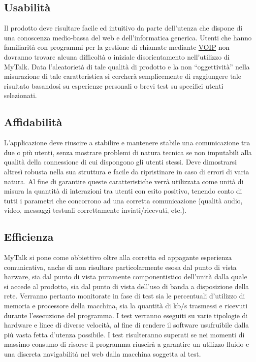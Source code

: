 \subsection{Usabilità}
Il prodotto deve risultare facile ed intuitivo da parte dell'utenza che dispone di una conoscenza medio-bassa del web e dell'informatica generica.
Utenti che hanno familiarità con programmi per la gestione di chiamate mediante \underline{VOIP} non dovranno trovare alcuna difficoltà o iniziale disorientamento nell'utilizzo di MyTalk.
Data l'aleatorietà di tale qualità di prodotto e la non ``oggettività'' nella misurazione di tale caratteristica si cercherà semplicemente di raggiungere tale risultato basandosi su esperienze personali o brevi test su specifici utenti selezionati.
\subsection{Affidabilità}
L'applicazione deve riuscire a stabilire e mantenere stabile una comunicazione tra due o più utenti, senza mostrare problemi di natura tecnica se non imputabili alla qualità della connessione di cui dispongono gli utenti stessi. Deve dimostrarsi altresì robusta nella sua struttura e facile da ripristinare in caso di errori di varia natura.
Al fine di garantire queste caratteristiche verrà utilizzata come unità di misura la quantità di interazioni tra utenti con esito positivo, tenendo conto di tutti i parametri che concorrono ad una corretta comunicazione (qualità audio, video, messaggi testuali correttamente inviati/ricevuti, etc.).
\subsection{Efficienza}
MyTalk si pone come obbiettivo oltre alla corretta ed appagante esperienza comunicativa, anche di non risultare particolarmente esosa dal punto di vista harware, sia dal punto di vista puramente componentistico dell'unità dalla quale si accede al prodotto, sia dal punto di vista dell'uso di banda a disposizione della rete.
Verranno pertanto monitorate in fase di test sia le percentuali d'utilizzo di memoria e processore della macchina, sia la quantità di kb/s trasmessi e ricevuti durante l'esecuzione del programma. I test verranno eseguiti su varie tipologie di hardware e linee di diverse velocità, al fine di rendere il software usufruibile dalla più vasta fetta d'utenza possibile.
I test risulteranno superati se nei momenti di massimo consumo di risorse il programma riuscirà a garantire un utilizzo fluido e una discreta navigabilità nel web dalla macchina soggetta al test. 

